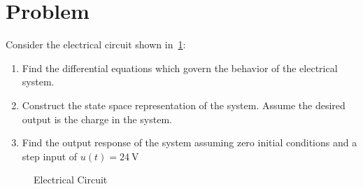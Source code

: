 \documentclass[titlepage, 11pt, reqno]{article}    %
\begin{document}
\section{Problem}
Consider the electrical circuit shown in~\cref{fig:elec_circuit}:
\begin{enumerate}
    \item Find the differential equations which govern the behavior of the electrical system.
    \item Construct the state space representation of the system. 
        Assume the desired output is the charge in the system.
    \item Find the output response of the system assuming zero initial conditions and a step input of \(u(t) = \SI{24}{\volt}\)
\end{enumerate}
\begin{figure}[htbp]
\centering
\begin{scaletikzpicturetowidth}{0.5\textwidth}
\end{scaletikzpicturetowidth}
\caption{Electrical Circuit~\label{fig:elec_circuit}}
\end{figure}
\clearpage
\newpage
\thispagestyle{plain}
\mbox{}
\clearpage
\end{document}
